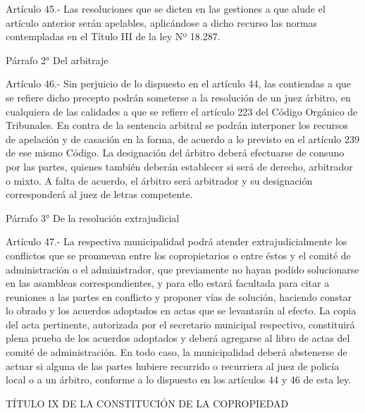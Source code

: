     Artículo 45.- Las resoluciones que se dicten en las gestiones a que alude el artículo anterior serán apelables,  aplicándose a  dicho recurso las  normas contempladas en el Título III de la ley Nº 18.287.
     
    Párrafo 2°
    Del arbitraje

     
    Artículo 46.- Sin perjuicio de lo dispuesto en el artículo 44, las contiendas a que se refiere dicho precepto podrán someterse a la resolución de un juez árbitro, en cualquiera de las calidades a que se refiere el artículo 223 del Código Orgánico de Tribunales. En contra de la sentencia arbitral se podrán interponer los recursos de apelación y de casación en la forma, de acuerdo a lo previsto en el artículo 239 de ese mismo Código.
    La designación del árbitro deberá efectuarse de consuno por las partes, quienes también deberán establecer si será de derecho, arbitrador o mixto. A falta de acuerdo, el árbitro será arbitrador y su designación corresponderá al juez de letras competente.
     
    Párrafo 3°
    De la resolución extrajudicial

     
    Artículo 47.- La respectiva municipalidad podrá atender extrajudicialmente los conflictos que se promuevan entre los copropietarios o entre éstos y el comité de administración o el administrador, que previamente no hayan podido solucionarse en las asambleas correspondientes, y para ello estará facultada para citar a reuniones a las partes en conflicto y proponer vías de solución, haciendo constar lo obrado y los acuerdos adoptados en actas que se levantarán al efecto. La copia del acta pertinente, autorizada por el secretario municipal respectivo, constituirá plena prueba de los acuerdos adoptados y deberá agregarse al libro de actas del comité de administración. En todo caso, la municipalidad deberá abstenerse de actuar si alguna de las partes hubiere recurrido o recurriera al juez de policía local o a un árbitro, conforme a lo dispuesto en los artículos 44 y 46 de esta ley.

    TÍTULO IX
    DE LA CONSTITUCIÓN DE LA COPROPIEDAD


